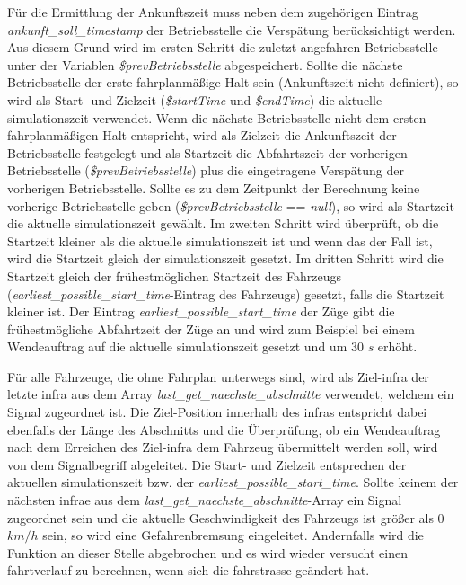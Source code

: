 Für die Ermittlung der Ankunftszeit muss neben dem zugehörigen Eintrag \textit{ankunft\_soll\_timestamp} der Betriebsstelle die Verspätung berücksichtigt werden. Aus diesem Grund wird im ersten Schritt die zuletzt angefahren Betriebsstelle unter der Variablen \textit{\$prevBetriebsstelle} abgespeichert. Sollte die nächste Betriebsstelle der erste fahrplanmäßige Halt sein (Ankunftszeit nicht definiert), so wird als Start- und Zielzeit (\textit{\$startTime} und \textit{\$endTime}) die aktuelle \Gls{simulationszeit} verwendet. Wenn die nächste Betriebsstelle nicht dem ersten fahrplanmäßigen Halt entspricht, wird als Zielzeit die Ankunftszeit der Betriebsstelle festgelegt und als Startzeit die Abfahrtszeit der vorherigen Betriebsstelle (\textit{\$prevBetriebsstelle}) plus die eingetragene Verspätung der vorherigen Betriebsstelle. Sollte es zu dem Zeitpunkt der Berechnung keine vorherige Betriebsstelle geben (\textit{\$prevBetriebsstelle} == \textit{null}), so wird als Startzeit die aktuelle \Gls{simulationszeit} gewählt. Im zweiten Schritt wird überprüft, ob die Startzeit kleiner als die aktuelle \Gls{simulationszeit} ist und wenn das der Fall ist, wird die Startzeit gleich der \Gls{simulationszeit} gesetzt. Im dritten Schritt wird die Startzeit gleich der frühestmöglichen Startzeit des Fahrzeugs (\textit{earliest\_possible\_start\_time}-Eintrag des Fahrzeugs) gesetzt, falls die Startzeit kleiner ist. Der Eintrag \textit{earliest\_possible\_start\_time} der Züge gibt die frühestmögliche Abfahrtzeit der Züge an und wird zum Beispiel bei einem Wendeauftrag auf die aktuelle \Gls{simulationszeit} gesetzt und um 30 $s$ erhöht. 

Für alle Fahrzeuge, die ohne Fahrplan unterwegs sind, wird als Ziel-\ac{infra} der letzte \ac{infra} aus dem Array \textit{last\_get\_naechste\_abschnitte} verwendet, welchem ein Signal zugeordnet ist. Die Ziel-Position innerhalb des \ac{infra}s entspricht dabei ebenfalls der Länge des Abschnitts und die Überprüfung, ob ein Wendeauftrag nach dem Erreichen des Ziel-\ac{infra} dem Fahrzeug übermittelt werden soll, wird von dem Signalbegriff abgeleitet. Die Start- und Zielzeit entsprechen der aktuellen \Gls{simulationszeit} bzw. der \textit{earliest\_possible\_start\_time}. Sollte keinem der nächsten \ac{infra}e aus dem \textit{last\_get\_naechste\_abschnitte}-Array ein Signal zugeordnet sein und die aktuelle Geschwindigkeit des Fahrzeugs ist größer als 0 $km/h$ sein, so wird eine Gefahrenbremsung eingeleitet. Andernfalls wird die Funktion an dieser Stelle abgebrochen und es wird wieder versucht einen \Gls{fahrtverlauf} zu berechnen, wenn sich die \Gls{fahrstrasse} geändert hat.

